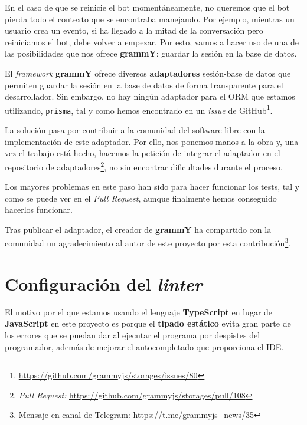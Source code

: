 En el caso de que se reinicie el bot momentáneamente, no queremos que el bot pierda todo el contexto que se encontraba manejando. Por ejemplo, mientras un usuario crea un evento, si ha llegado a la mitad de la conversación pero reiniciamos el bot, debe volver a empezar. Por esto, vamos a hacer uso de una de las posibilidades que nos ofrece \textbf{grammY}: guardar la sesión en la base de datos.


El \textit{framework} \textbf{grammY} ofrece diversos \textbf{adaptadores} sesión-base de datos que permiten guardar la sesión en la base de datos de forma transparente para el desarrollador. Sin embargo, no hay ningún adaptador para el ORM que estamos utilizando, \texttt{prisma}, tal y como hemos encontrado en un \textit{issue} de GitHub\footnote{\url{https://github.com/grammyjs/storages/issues/80}}.

La solución pasa por contribuir a la comunidad del software libre con la implementación de este adaptador. Por ello, nos ponemos manos a la obra y, una vez el trabajo está hecho, hacemos la petición de integrar el adaptador en el repositorio de adaptadores\footnote{\textit{Pull Request:}  \url{https://github.com/grammyjs/storages/pull/108}}, no sin encontrar dificultades durante el proceso.


Los mayores problemas en este paso han sido para hacer funcionar los tests, tal y como se puede ver en el \textit{Pull Request}, aunque finalmente hemos conseguido hacerlos funcionar.

Tras publicar el adaptador, el creador de \textbf{grammY} ha compartido con la comunidad un agradecimiento al autor de este proyecto por esta contribución\footnote{Mensaje en canal de Telegram: \url{https://t.me/grammyjs_news/35}}.

\section{Configuración del \textit{linter}}


El motivo por el que estamos usando el lenguaje \textbf{TypeScript} en lugar de \textbf{JavaScript} en este proyecto es porque el \textbf{tipado estático} evita gran parte de los errores que se puedan dar al ejecutar el programa por despistes del programador, además de mejorar el autocompletado que proporciona el IDE.

